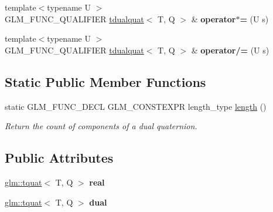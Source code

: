 \begin{DoxyCompactItemize}
\mbox{\label{structglm_1_1tdualquat_ab300e10bf89a90d694526c75ed423546}} 
{\footnotesize template$<$typename U $>$ }\\G\+L\+M\+\_\+\+F\+U\+N\+C\+\_\+\+Q\+U\+A\+L\+I\+F\+I\+ER \hyperlink{structglm_1_1tdualquat}{tdualquat}$<$ T, Q $>$ \& {\bfseries operator$\ast$=} (U s)
\item 
\mbox{\label{structglm_1_1tdualquat_a57b7a39ce0aee940340ac0f20e65963c}} 
{\footnotesize template$<$typename U $>$ }\\G\+L\+M\+\_\+\+F\+U\+N\+C\+\_\+\+Q\+U\+A\+L\+I\+F\+I\+ER \hyperlink{structglm_1_1tdualquat}{tdualquat}$<$ T, Q $>$ \& {\bfseries operator/=} (U s)
\end{DoxyCompactItemize}
\subsection*{Static Public Member Functions}
\begin{DoxyCompactItemize}
\item 
\mbox{\label{structglm_1_1tdualquat_a79fe24c72a3f26d906b080de34b92b4e}} 
static G\+L\+M\+\_\+\+F\+U\+N\+C\+\_\+\+D\+E\+CL G\+L\+M\+\_\+\+C\+O\+N\+S\+T\+E\+X\+PR length\+\_\+type \hyperlink{structglm_1_1tdualquat_a79fe24c72a3f26d906b080de34b92b4e}{length} ()
\begin{DoxyCompactList}\small\item\em Return the count of components of a dual quaternion. \end{DoxyCompactList}\end{DoxyCompactItemize}
\subsection*{Public Attributes}
\begin{DoxyCompactItemize}
\item 
\mbox{\label{structglm_1_1tdualquat_a25909f92feb14a77756d2e83f9ec0b20}} 
\hyperlink{structglm_1_1tquat}{glm\+::tquat}$<$ T, Q $>$ {\bfseries real}
\item 
\mbox{\label{structglm_1_1tdualquat_a6e9bac4577ea5ff7e47104c183f3955a}} 
\hyperlink{structglm_1_1tquat}{glm\+::tquat}$<$ T, Q $>$ {\bfseries dual}
\end{DoxyCompactItemize}


